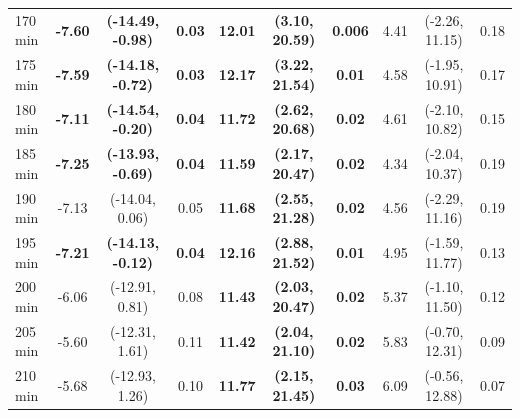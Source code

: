 \begin{table}[ht]
{\begin{tabular}{lccccccccc}
170 min & \textbf{-7.60} & \textbf{(-14.49, -0.98)} & \textbf{0.03} & \textbf{12.01} & \textbf{(3.10, 20.59)} & \textbf{0.006} & 4.41 & (-2.26, 11.15) & 0.18 \\
175 min & \textbf{-7.59} & \textbf{(-14.18, -0.72)} & \textbf{0.03} & \textbf{12.17} & \textbf{(3.22, 21.54)} & \textbf{0.01} & 4.58 & (-1.95, 10.91) & 0.17 \\
180 min & \textbf{-7.11} & \textbf{(-14.54, -0.20)} & \textbf{0.04} & \textbf{11.72} & \textbf{(2.62, 20.68)} & \textbf{0.02} & 4.61 & (-2.10, 10.82) & 0.15 \\
185 min & \textbf{-7.25} & \textbf{(-13.93, -0.69)} & \textbf{0.04} & \textbf{11.59} & \textbf{(2.17, 20.47)} & \textbf{0.02} & 4.34 & (-2.04, 10.37) & 0.19 \\
190 min & -7.13 & (-14.04, 0.06) & 0.05 & \textbf{11.68} & \textbf{(2.55, 21.28)} & \textbf{0.02} & 4.56 & (-2.29, 11.16) & 0.19 \\
195 min & \textbf{-7.21} & \textbf{(-14.13, -0.12)} & \textbf{0.04} & \textbf{12.16} & \textbf{(2.88, 21.52)} & \textbf{0.01} & 4.95 & (-1.59, 11.77) & 0.13 \\
200 min & -6.06 & (-12.91, 0.81) & 0.08 & \textbf{11.43} & \textbf{(2.03, 20.47)} & \textbf{0.02} & 5.37 & (-1.10, 11.50) & 0.12 \\
205 min & -5.60 & (-12.31, 1.61) & 0.11 & \textbf{11.42} & \textbf{(2.04, 21.10)} & \textbf{0.02} & 5.83 & (-0.70, 12.31) & 0.09 \\
210 min & -5.68 & (-12.93, 1.26) & 0.10 & \textbf{11.77} & \textbf{(2.15, 21.45)} & \textbf{0.03} & 6.09 & (-0.56, 12.88) & 0.07 \\
\bottomrule
\end{tabular}%
}
\end{table}
